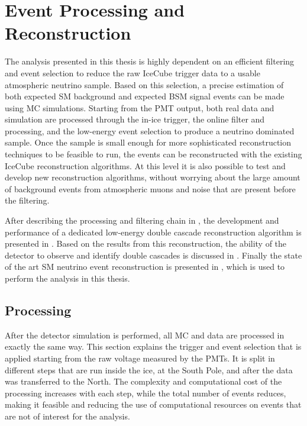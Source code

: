 \setchapterpreamble[u]{\margintoc}


\chapter{Event Processing and Reconstruction}

The analysis presented in this thesis is highly dependent on an efficient filtering and event selection to reduce the raw IceCube trigger data to a usable atmospheric neutrino sample. Based on this selection, a precise estimation of both expected SM background and expected BSM signal events can be made using MC simulations.
Starting from the PMT output, both real data and simulation are processed through the in-ice trigger, the online filter and processing, and the low-energy event selection to produce a neutrino dominated sample. Once the sample is small enough for more sophisticated reconstruction techniques to be feasible to run, the events can be reconstructed with the existing IceCube reconstruction algorithms. At this level it is also possible to test and develop new reconstruction algorithms, without worrying about the large amount of background events from atmospheric muons and noise that are present before the filtering.

After describing the processing and filtering chain in , the development and performance of a dedicated low-energy double cascade reconstruction algorithm is presented in . Based on the results from this reconstruction, the ability of the detector to observe and identify double cascades is discussed in . Finally the state of the art SM neutrino event reconstruction is presented in , which is used to perform the analysis in this thesis.


\section{Processing} 

After the detector simulation is performed, all MC and data are processed in exactly the same way. This section explains the trigger and event selection that is applied starting from the raw voltage measured by the PMTs. It is split in different steps that are run inside the ice, at the South Pole, and after the data was transferred to the North. The complexity and computational cost of the processing increases with each step, while the total number of events reduces, making it feasible and reducing the use of computational resources on events that are not of interest for the analysis. 


